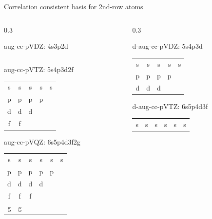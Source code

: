 \documentclass[aspectratio=169,9pt]{beamer}
\newcommand{\purple}[1]{\textcolor{hfPurple}{#1}}
\newcommand{\red}[1]{\textcolor{hfRed}{#1}}
\newcommand{\green}[1]{\textcolor{hfGreen}{#1}}
\newcommand{\blue}[1]{\textcolor{hfBlue}{#1}}
\newcommand{\violet}[1]{\textcolor{hfViolet}{#1}}
\begin{document}
\begin{frame}{Correlation consistent basis for 2nd-row atoms}
\begin{columns}
\begin{column}{0.3\textwidth}
\begin{block}{\red{aug}-cc-pVDZ: \small 4s3p2d}
\begin{tabular}{cccc}
        		\end{tabular}
        	\end{block}
        	\begin{block}{\red{aug}-cc-pVTZ: \small 5s4p3d2f}
        		\begin{tabular}{ccccc}
        			\green{s} & \green{s} & \green{s} & \blue{s} & \red{s} \\
        			\green{p} & \green{p} & \blue{p} & \red{p} \\
        			\green{d} & \blue{d} & \red{d} \\
        			\blue{f} & \red{f}  \\
        		\end{tabular}
        	\end{block}
        	\begin{block}{\red{aug}-cc-pVQZ: \small 6s5p4d3f2g}
        		\begin{tabular}{cccccc}
        			\green{s} & \green{s} & \green{s} & \blue{s} & \violet{s} & \red{s} \\
        			\green{p} & \green{p} & \blue{p} & \violet{p} & \red{p} \\
        			\green{d} & \blue{d} & \violet{d} & \red{d} \\
        			\blue{f} & \violet{f} & \red{f} \\
        			\violet{g} & \red{g} \\
        		\end{tabular}
        	\end{block}
		\end{column}
		\begin{column}{0.3\textwidth}
        	\begin{block}{\purple{d}-\red{aug}-cc-pVDZ: \small 5s4p3d}
        		\begin{tabular}{ccccc}
        			\green{s} & \green{s} & \green{s} & \red{s} & \purple{s} \\
        			\green{p} & \green{p} & \red{p} & \purple{p} \\
        			\green{d} & \red{d} & \purple{d} \\
        		\end{tabular}
        	\end{block}
        	\begin{block}{\purple{d}-\red{aug}-cc-pVTZ: \small 6s5p4d3f}
        		\begin{tabular}{cccccc}
        			\green{s} & \green{s} & \green{s} & \blue{s} & \red{s} & \purple{s} \\

\end{tabular}
\end{block}
\end{column}
\end{columns}
\end{frame}
\end{document}
